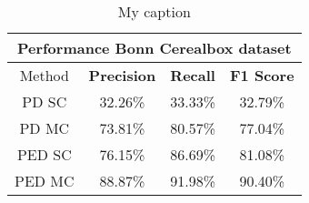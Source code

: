 \begin{table}[H]
\centering
\begin{tabular}{|c|c|c|c|}
\hline
\multicolumn{4}{|c|}{Performance Bonn Cerealbox dataset}                        \\ \hline
Method & \textbf{Precision} & \textbf{Recall} & \textbf{F1 Score} \\ \hline
PD SC & 32.26\%   & 33.33\%     & 32.79\%  \\ \hline
PD MC & 73.81\%   & 80.57\%     & 77.04\%  \\ \hline 
PED SC & 76.15\%   & 86.69\%     & 81.08\%  \\ \hline
PED MC & 88.87\%   & 91.98\%     & 90.40\%  \\ \hline               
\end{tabular}
\caption[Cars Varying $\lambda$]{My caption}
\label{tab:bonn_cerealbox_performance}
\end{table}






